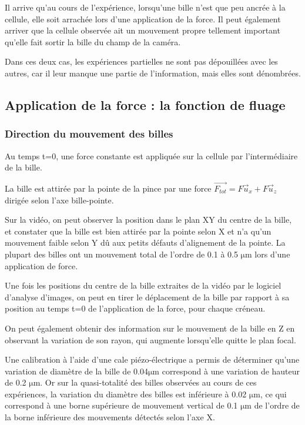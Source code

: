 \documentclass{report}
\newcommand{\micro}{$\mathrm{\mu}$}
\begin{document}
Il arrive qu'au cours de l'expérience, lorsqu'une bille n'est que peu ancrée à la cellule, elle soit arrachée lors d'une application de la force.
Il peut également arriver que la cellule observée ait un mouvement propre tellement important qu'elle fait sortir la bille du  champ de la caméra. 

Dans ces deux cas, les expériences partielles ne sont pas dépouillées avec les autres, car il leur manque une partie de l'information, mais elles sont dénombrées.

\subsection{Application de la force : la fonction de fluage}

\subsubsection{Direction du mouvement des billes}
Au temps t=0, une force constante est appliquée sur la cellule par l'intermédiaire de la bille. 

La bille est attirée par la pointe de la pince par une force $\vec{F_{tot}}=F \vec{u}_x+F\vec{u}_z$ dirigée selon l'axe bille-pointe. 

Sur la vidéo, on peut observer la position dans le plan XY du centre de la bille, et constater que la bille est bien attirée par la pointe selon X et n'a qu'un mouvement faible selon Y dû aux petits défauts d'alignement de la pointe. La plupart des billes ont un mouvement total de l'ordre de 0.1 à 0.5 \micro m lors d'une application de force. 

Une fois les positions du centre de la bille extraites de la vidéo par le logiciel d'analyse d'images, on peut en tirer le déplacement de la bille par rapport à sa position au temps t=0 de l'application de la force, pour chaque créneau. 
 

On peut également obtenir des information sur le mouvement de la bille en Z en observant la variation de son rayon, qui augmente lorsqu'elle quitte le plan focal. 

Une calibration à l'aide d'une cale piézo-électrique a permis de déterminer qu'une variation de diamètre de la bille de 0.04\micro m correspond à une variation de hauteur de 0.2 \micro m. 
Or sur la quasi-totalité des billes observées au cours de ces expériences, la variation du diamètre des billes est inférieure à 0.02 \micro m, ce qui correspond à une borne supérieure de mouvement vertical de 0.1 \micro m de l'ordre de la borne inférieure des mouvements détectés selon l'axe X. 
\end{document}
